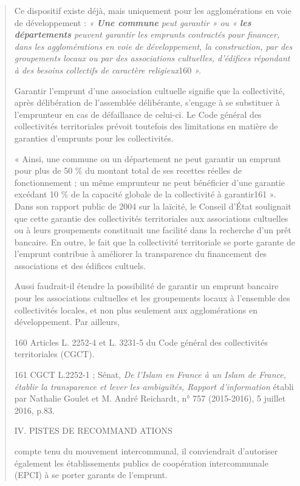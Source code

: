 \begin{quote}
Ce dispositif existe déjà, mais uniquement pour les agglomérations en
voie de développement : \emph{« \textbf{Une commune} peut garantir » ou
« \textbf{les départements} peuvent garantir les emprunts contractés
pour financer, dans les agglomérations en voie de développement, la
construction, par des groupements locaux ou par des associations
cultuelles, d'édifices répondant à des besoins collectifs de caractère
religieux}160 \emph{».}

Garantir l'emprunt d'une association cultuelle signifie que la
collectivité, après délibération de l'assemblée délibérante, s'engage à
se substituer à l'emprunteur en cas de défaillance de celui-ci. Le Code
général des collectivités territoriales prévoit toutefois des
limitations en matière de garanties d'emprunts pour les collectivités.

« Ainsi, une commune ou un département ne peut garantir un emprunt pour
plus de 50 \% du montant total de ses recettes réelles de fonctionnement
; un même emprunteur ne peut bénéficier d'une garantie excédant 10 \% de
la capacité globale de la collectivité à garantir161 ». Dans son rapport
public de 2004 sur la laïcité, le Conseil d'État soulignait que cette
garantie des collectivités territoriales aux associations cultuelles ou
à leurs groupements constituait une facilité dans la recherche d'un prêt
bancaire. En outre, le fait que la collectivité territoriale se porte
garante de l'emprunt contribue à améliorer la transparence du
financement des associations et des édifices cultuels.

Aussi faudrait-il étendre la possibilité de garantir un emprunt bancaire
pour les associations cultuelles et les groupements locaux à l'ensemble
des collectivités locales, et non plus seulement aux agglomérations en
développement. Par ailleurs,

160 Articles L. 2252-4 et L. 3231-5 du Code général des collectivités
territoriales (CGCT).

161 CGCT L.2252-1 ; Sénat, \emph{De l'Islam en France à un Islam de
France, établir la transparence et lever les ambiguïtés, Rapport
d'information} établi par Nathalie Goulet et M. André Reichardt, n° 757
(2015-2016), 5 juillet 2016, p.83.

IV. PISTES DE RECOMMAND ATIONS

compte tenu du mouvement intercommunal, il conviendrait d'autoriser
également les établissements publics de coopération intercommunale
(EPCI) à se porter garants de l'emprunt.
\end{quote}


